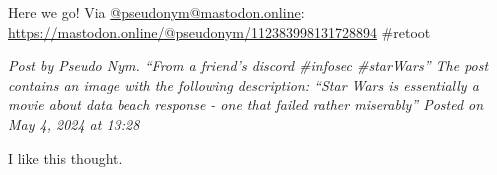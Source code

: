 Here we go! Via
\href{https://mastodon.online/@pseudonym}{@pseudonym@mastodon.online}:
\url{https://mastodon.online/@pseudonym/112383998131728894} \#retoot


\emph{Post by Pseudo Nym. ``From a friend's discord \#infosec
\#starWars'' The post contains an image with the following description:
``Star Wars is essentially a movie about data beach response - one that
failed rather miserably'' Posted on May 4, 2024 at 13:28}

I like this thought.
